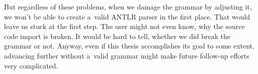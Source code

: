 But regardless of these problems, when we damage the grammar by adjusting it, we won't be able to create a~valid ANTLR parser in the first place.
That would leave us stuck at the first step.
The user might not even know, why the source code import is broken.
It would be hard to tell, whether we did break the grammar or not.
Anyway, even if this thesis accomplishes its goal to some extent, advancing further without a~valid grammar might make future follow-up efforts very complicated.
